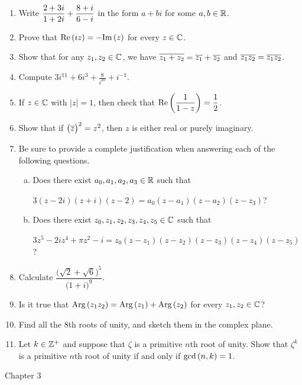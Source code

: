 \documentclass[11pt,fleqn,dvipsnames,usenames]{article}
\begin{document}
\begin{enumerate}
\item Write $\displaystyle{\frac{2 + 3i}{1 + 2i} + \frac{8+i}{6-i}}$ in the form $a+bi$ for some $a,b\in\mathbb{R}$.
\item Prove that $\text{Re}\left(iz\right) = -\text{Im}\left(z\right)$ for every $z\in\mathbb{C}$.
\item Show that for any $z_{1},z_{2}\in\mathbb{C}$, we have $\overline{z_{1} + z_{2}} = \overline{z_{1}} + \overline{z_{2}}$ and $\overline{z_{1}z_{2}} = \overline{z_{1}}\overline{z_{2}}$.
\item Compute $3i^{11} + 6i^{3} + \frac{8}{i^{20}} + i^{-1}$.
\item If $z\in\mathbb{C}$ with $|z| = 1$, then check that $\text{Re}\left(\dfrac{1}{1-z}\right) = \dfrac{1}{2}$.
\item Show that if $\big(\overline{z}\big)^2 = z^2$, then $z$ is either real or purely imaginary.
\item Be sure to provide a complete justification when answering each of the following questions.
\begin{enumerate}[(a)]
\item Does there exist $a_{0},a_{1},a_{2},a_{3}\in \mathbb{R}$ such that
\begin{center}
$3(z-2i)(z+i)(z-2) = a_{0}(z-a_{1})(z - a_{2})(z - z_{3})$?
\end{center}
\item Does there exist $z_{0},z_{1},z_{2},z_{3},z_{4},z_{5}\in \mathbb{C}$ such that
\begin{center}
$3z^5 - 2iz^4 + \pi z^2 - i = z_{0}(z - z_{1})(z - z_{2})(z - z_{3})(z - z_{4})(z - z_{5})$?
\end{center}
\end{enumerate}
\item Calculate $\dfrac{\big(\sqrt{2} + \sqrt{6}\big)^5}{\big(1+i\big)^9}$.
\item Is it true that $\text{Arg}\left(z_1z_2\right) = \text{Arg}\left(z_1\right) + \text{Arg}\left(z_2\right)$ for every $z_{1},z_{2}\in\mathbb{C}$?
\item Find all the $8$th roots of unity, and sketch them in the complex plane.
\item Let $k\in\mathbb{Z}^{+}$ and suppose that $\zeta$ is a primitive $n$th root of unity.  Show that $\zeta^{k}$ is a primitive $n$th root of unity if and only if $\text{gcd}\left(n,k\right) = 1$.
\end{enumerate}
\vsp

{\huge Chapter 3}
\vsp
\end{document}
